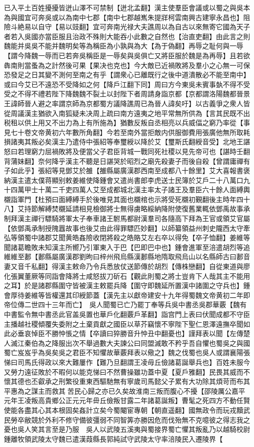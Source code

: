 已入平土百姓擾擾皆迸山澤不可禁制【迸北孟翻】漢主使羣臣會議或以蜀之與吳本為與國宜可奔吳或以為南中七郡【南中七郡越嶲朱提牂柯雲南興古建寧永昌也】阻險斗絶易以自守【易以豉翻】宜可奔南光禄大夫譙周以為自古以來無寄它國為天子者若入吳國亦當臣服且治政不殊則大能吞小此數之自然也【治直吏翻】由此言之則魏能并吳吳不能并魏明矣等為稱臣為小孰與為大【為于偽翻】再辱之耻何與一辱【謂今降魏一辱而已若奔吳稱臣是一辱矣與吳俱亡又將臣服於魏是為再辱】且若欲犇南則當蚤為之計然後可果【果决也克也】今大敵已近禍敗將及羣小之心無一可保恐發足之日其變不測何至南之有乎【謂衆心已離既行之後中道潰散必不能至南中】或曰今艾已不遠恐不受降如之何【降戶江翻下同】周曰方今東吳未賓事埶不得不受受之不得不禮若陛下降魏魏不裂土以封陛下者周請身詣京都【京都謂洛陽魏都晉景王諱師晉人避之率謂京師為京都蜀方議降譙周已為晉人諱矣吁】以古義爭之衆人皆從周議漢主猶欲入南狐疑未决周上疏曰南方遠夷之地平常無所供為【言其民既不出税租以供上用又不出力為上有所施為】猶數反叛自丞相亮以兵威偪之窮乃率從【事見七十卷文帝黄初六年數所角翻】今若至南外當拒敵内供服御費用張廣他無所取耗損諸夷其叛必矣漢主乃遣侍中張紹等奉璽綬以降於艾【璽斯氏翻綬音受】北地王諶怒曰若理窮力屈禍敗將及便當父子君臣背城一戰同死社稷以見先帝可也【諶時壬翻背蒲妹翻】奈何降乎漢主不聽是日諶哭於昭烈之廟先殺妻子而後自殺【曾謂庸禪有子如此乎】張紹等見鄧艾於雒【雒縣屬廣漢郡西南至成都八十餘里】艾大喜報書褒納漢主遣太僕蒋顯别敕姜維使降鍾會又遣尚書郎李虎送士民簿於艾戶二十八萬口九十四萬甲士十萬二千吏四萬人艾至成都城北漢主率太子諸王及羣臣六十餘人面縛輿櫬詣軍門【杜預曰面縛縛手於後唯見其面也櫬棺也示將受死櫬初覲翻後主時年四十八】艾持節解縛焚櫬延請相見檢御將士無得虜略綏納降附使復舊業輒依鄧禹故事承制拜漢主禪行驃騎將軍太子奉車諸王駙馬都尉漢羣司各隨高下拜為王官或領艾官屬【依鄧禹承制授隗囂故事也後艾由此得罪驃匹妙翻】以師纂領益州刺史隴西太守牽弘等領蜀中諸郡艾聞黄皓姦險收閉將殺之皓賂艾左右卒以得免【卒子恤翻】姜維等聞諸葛瞻敗未知漢主所嚮乃引軍東入于巴【巴即巴中也】鍾會進軍至涪遣胡烈等追維維至郪【郪縣屬廣漢郡劉昫曰梓州飛烏縣漢郪縣地隋取飛烏山以名縣師古曰郪音妻又音千私翻】得漢主敕命乃令兵悉放仗送節傳於胡烈【傳株戀翻】自從東道與廖化張翼董厥等同詣會降將士咸怒拔刀斫石【觀此則蜀之將士豈肯下人哉其主不能用之耳】於是諸郡縣圍守皆被漢主敕罷兵降【圍守即魏延所置漢中諸圍之守兵也】鍾會厚待姜維等皆權還其印綬節蓋【漢先主以獻帝建安十九年得蜀魏文帝黄初二年即帝位傳二世四十三年而亡】　吳人聞蜀已亡乃罷丁奉等兵吳中書丞吳郡華覈【魏有中書監令無中書丞此官盖吳置也華戶化翻覈戶革翻】詣宫門上表曰伏聞成都不守臣主播越社稷傾覆失委附之土棄貢獻之國臣以草芥竊懷不寧陛下聖仁恩澤遠撫卒聞如此必垂哀悼臣不勝忡悵之情【卒讀曰猝勝音升忡丑中翻憂也】謹拜表以聞【左傳楚人滅江秦伯為之降服出次不舉過數大夫諫公曰同盟滅敢不矜乎吾自懼也蜀吳之與國蜀亡岌岌乎為吳矣吳之君臣不知懼故華覈拜表以儆之】魏之伐蜀也吳人或謂襄陽張悌曰司馬氏得政以來大難屢作【難乃旦翻謂王凌毋丘儉諸葛誕舉兵也】百姓未服今又勞力遠征敗於不暇何以能克悌曰不然曹操雖功蓋中夏【夏戶雅翻】民畏其威而不懷其德也丕叡承之刑繁役重東西驅馳無有寧歲司馬懿父子累有大功除其煩苛而布其平惠為之謀主而救其苦民心歸之亦已久矣故淮南三叛而腹心不擾【邵陵厲公嘉平元年王凌叛高貴鄉公正元元年毌丘儉叛甘露二年諸葛誕叛】曹髦之死四方不動任賢使能各盡其心其本根固矣姦計立矣今蜀閹宦專朝【朝直遥翻】國無政令而玩戎黷武民勞卒敝競於外利不修守備彼彊弱不同智筭亦勝因危而伐殆無不克噫彼之得志我之憂也吳人笑其言至是乃服　吳人以武陵五溪夷與蜀接界蜀亡懼其叛亂乃以越騎校尉鍾離牧領武陵太守魏已遣漢葭縣長郭純試守武陵太守率涪陵民入遷陵界【